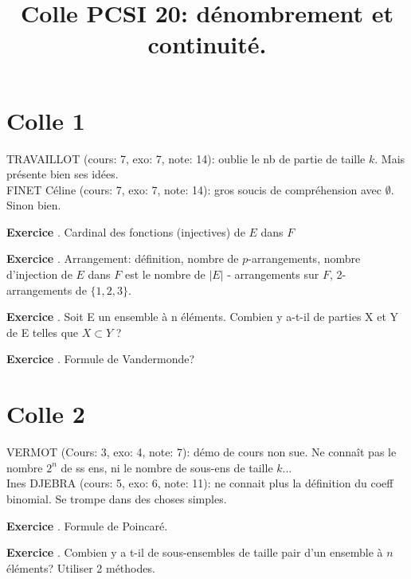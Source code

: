 \documentclass[10pt,a4paper]{article}
\title{Colle PCSI 20: dénombrement et continuité.}
\newcounter{question}
\newcounter{exo}
\newenvironment{exo}{\vspace{0.5cm}\setcounter{question}{0}\addtocounter{exo}{1} \noindent \textbf{Exercice \theexo}. \normalsize }{\par}
\begin{document}
	\maketitle
	
	
	\section*{Colle 1}
	\setcounter{exo}{0}
	TRAVAILLOT (cours: 7, exo: 7, note: 14): oublie le nb de partie de taille $k$. Mais présente bien ses idées.\\
	FINET Céline (cours: 7, exo: 7, note: 14): gros soucis de compréhension avec $\emptyset$. Sinon bien. \\
	\begin{exo}
		Cardinal des fonctions (injectives) de $E$ dans $F$
	\end{exo}
	
	\begin{exo}
		Arrangement: définition, nombre de $p$-arrangements, nombre d'injection de $E$ dans $F$ est le nombre de $\vert E \vert$ - arrangements sur $F$, 2-arrangements de $\lbrace 1, 2, 3 \rbrace$.
	\end{exo}

	\begin{exo}
		Soit E un ensemble à n éléments. Combien y a-t-il de parties X et Y de E telles que
		$X \subset Y$ ?
	\end{exo}
	
	\begin{exo}
		Formule de Vandermonde?
	\end{exo}

	\section*{Colle 2}
	\setcounter{exo}{0}
	VERMOT (Cours: 3, exo: 4, note: 7): démo de cours non sue. Ne connaît pas le nombre $2^n$ de ss ens, ni le nombre de sous-ens de taille $k$...\\
	Ines DJEBRA (cours: 5, exo: 6, note: 11): ne connait plus la définition du coeff binomial. Se trompe dans des choses simples.
	
	\begin{exo}
		Formule de Poincaré.
	\end{exo}		

	\begin{exo}
		Combien y a t-il de sous-ensembles de taille pair d'un ensemble à $n$ éléments? Utiliser 2 méthodes.
	\end{exo}
\end{document}
